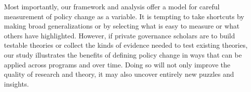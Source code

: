 \documentclass[
      12pt,
            Review ]{article}
\begin{document}
Most importantly, our framework and analysis offer a model for careful
measurement of policy change as a variable. It is tempting to take
shortcuts by making broad generalizations or by selecting what is easy
to measure or what others have highlighted. However, if private
governance scholars are to build testable theories or collect the kinds
of evidence needed to test existing theories, our study illustrates the
benefits of defining policy change in ways that can be applied across
programs and over time. Doing so will not only improve the quality of
research and theory, it may also uncover entirely new puzzles and
insights.
\newpage
\singlespacing 
           
  
\end{document}
